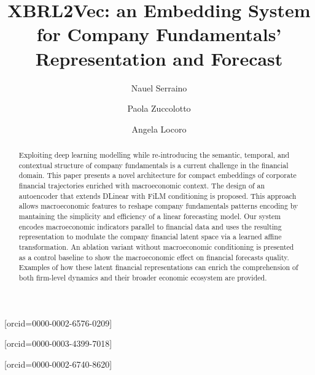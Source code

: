 \documentclass[a4paper,fleqn]{cas-dc}
\begin{document}
\let\WriteBookmarks\relax
\def\floatpagepagefraction{1}
\def\textpagefraction{.001}

\shorttitle{}    

\title[mode = title]{XBRL2Vec: an Embedding System for Company Fundamentals' Representation and Forecast}

\author[1,2]{Nauel Serraino}[orcid=0000-0002-6576-0209]
\cormark[1]

\author[1]{Paola Zuccolotto}[orcid=0000-0003-4399-7018]

\author[1]{Angela Locoro}[orcid=0000-0002-6740-8620]




\begin{abstract}
Exploiting deep learning modelling while re-introducing the semantic, temporal, and contextual structure of company fundamentals is a current challenge in the financial domain.
This paper presents a novel architecture for compact embeddings of corporate financial trajectories enriched with macroeconomic context. The design of an autoencoder that extends DLinear with FiLM conditioning is proposed.  
This approach allows macroeconomic features to reshape company fundamentals patterns encoding by mantaining the simplicity and efficiency of a linear forecasting model. Our system encodes macroeconomic indicators parallel to financial data and uses the resulting representation to modulate the company financial latent space via a learned affine transformation. An ablation variant without macroeconomic conditioning is presented as a control baseline to show the macroeconomic effect on financial forecasts quality. Examples of how these latent financial representations can enrich the comprehension of both firm-level dynamics and their broader economic ecosystem are provided.  %
\end{abstract}
\end{document}
